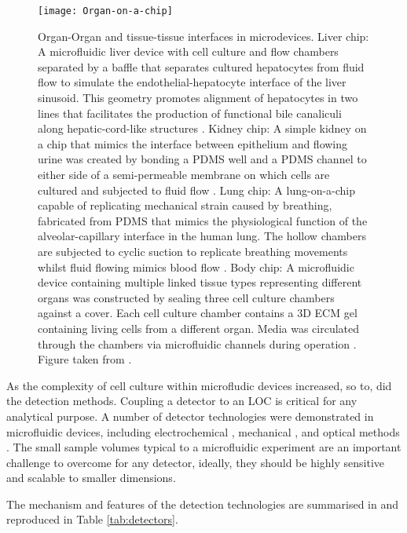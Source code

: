 \begin{figure}
  \begin{center}
  \texttt{[image: Organ-on-a-chip]}
  \end{center}
  \caption{Organ-Organ and tissue-tissue interfaces in microdevices. Liver chip: A microfluidic liver device with cell culture and flow chambers separated by
  a baffle that separates cultured hepatocytes from fluid flow to simulate the endothelial-hepatocyte interface of the liver sinusoid. This geometry promotes alignment
  of hepatocytes in two lines that facilitates the production of functional bile canaliculi along hepatic-cord-like structures \citep{nakao2011bile}. Kidney chip:
  A simple kidney on a chip that mimics the interface between epithelium and flowing urine was created by bonding a PDMS well and a PDMS channel to either side
  of a semi-permeable membrane on which cells are cultured and subjected to fluid flow \citep{jang2010multi}. Lung chip: A lung-on-a-chip capable of replicating mechanical
  strain caused by breathing, fabricated from PDMS that mimics the physiological function of the alveolar-capillary interface in the human lung. The hollow chambers
  are subjected to cyclic suction to replicate breathing movements whilst fluid flowing mimics blood flow \citep{huh2010reconstituting}. Body chip: A
  microfluidic device containing multiple linked tissue types representing different organs was constructed by sealing three cell culture chambers against a cover. Each
  cell culture chamber contains a 3D ECM gel containing living cells from a different organ. Media was circulated through the chambers via microfluidic channels
  during operation \citep{sung2009micro}. Figure taken from \citep{huh2012microengineered}.}
  \label{fig:OrganChip}
\end{figure}

As the complexity of cell culture within microfludic devices increased, so to, did the detection methods. Coupling
a detector to an LOC is critical for any analytical purpose. A number of detector technologies were demonstrated in
microfluidic devices, including electrochemical \citep{wang2006electrochemical}, mechanical \citep{raiteri2001micromechanical},
and optical methods \citep{kuswandi2007optical}. The small sample volumes typical to a microfluidic experiment
are an important challenge to overcome for any detector, ideally, they should be highly sensitive and scalable
to smaller dimensions.

The mechanism and features of the detection technologies are summarised in \citep{pires2014recent} and
reproduced in Table \ref{tab:detectors}.

